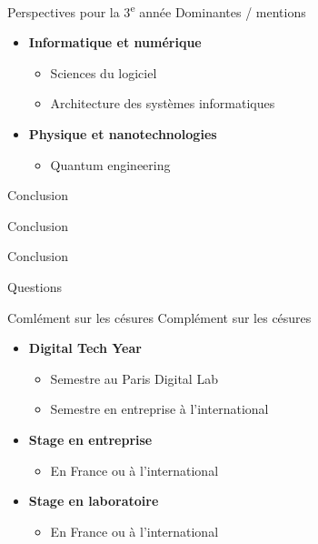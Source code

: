 \documentclass[french, 12pt]{beamer}
\begin{document}
\begin{frame}{Perspectives pour la 3\textsuperscript{e} année}
Dominantes / mentions
\vspace{.5em}
\begin{itemize}
    \item \textbf{Informatique et numérique}
    \begin{itemize}
        \item Sciences du logiciel
        \item Architecture des systèmes informatiques
    \end{itemize}
    \item \textbf{Physique et nanotechnologies}
    \begin{itemize}
        \item Quantum engineering
    \end{itemize}
\end{itemize}
\end{frame}

\begin{frame}{Conclusion}
\begin{center}
    \huge{Conclusion}
\end{center}
\end{frame}

\begin{frame}{Conclusion}
    \begin{center}
        \huge{Questions}
    \end{center}
\end{frame}

\begin{frame}{Comlément sur les césures}
Complément sur les césures
\begin{itemize}
    \item \textbf{Digital Tech Year}
    \begin{itemize}
        \item Semestre au Paris Digital Lab
        \item Semestre en entreprise à l'international
    \end{itemize}
    \item \textbf{Stage en entreprise}
    \begin{itemize}
        \item En France ou à l'international
    \end{itemize}
    \item \textbf{Stage en laboratoire}
    \begin{itemize}
        \item En France ou à l'international
    \end{itemize}
\end{itemize}
\end{frame}
\end{document}
